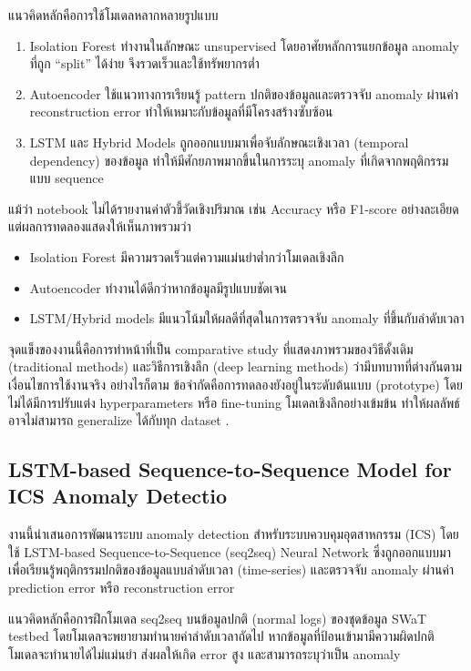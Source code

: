 แนวคิดหลักคือการใช้โมเดลหลากหลายรูปแบบ
\begin{enumerate}
  \item Isolation Forest ทำงานในลักษณะ unsupervised โดยอาศัยหลักการแยกข้อมูล anomaly ที่ถูก “split” ได้ง่าย จึงรวดเร็วและใช้ทรัพยากรต่ำ
  \item Autoencoder ใช้แนวทางการเรียนรู้ pattern ปกติของข้อมูลและตรวจจับ anomaly ผ่านค่า reconstruction error ทำให้เหมาะกับข้อมูลที่มีโครงสร้างซับซ้อน
  \item LSTM และ Hybrid Models ถูกออกแบบมาเพื่อจับลักษณะเชิงเวลา (temporal dependency) ของข้อมูล ทำให้มีศักยภาพมากขึ้นในการระบุ anomaly ที่เกิดจากพฤติกรรมแบบ sequence
\end{enumerate}

แม้ว่า notebook ไม่ได้รายงานค่าตัวชี้วัดเชิงปริมาณ เช่น Accuracy หรือ F1-score อย่างละเอียด แต่ผลการทดลองแสดงให้เห็นภาพรวมว่า

\begin{itemize}
  \item Isolation Forest มีความรวดเร็วแต่ความแม่นยำต่ำกว่าโมเดลเชิงลึก
  \item Autoencoder ทำงานได้ดีกว่าหากข้อมูลมีรูปแบบชัดเจน
  \item LSTM/Hybrid models มีแนวโน้มให้ผลดีที่สุดในการตรวจจับ anomaly ที่ขึ้นกับลำดับเวลา
\end{itemize}

จุดแข็งของงานนี้คือการทำหน้าที่เป็น comparative study ที่แสดงภาพรวมของวิธีดั้งเดิม (traditional methods) และวิธีการเชิงลึก (deep learning methods) ว่ามีบทบาทที่ต่างกันตามเงื่อนไขการใช้งานจริง อย่างไรก็ตาม ข้อจำกัดคือการทดลองยังอยู่ในระดับต้นแบบ (prototype) โดยไม่ได้มีการปรับแต่ง hyperparameters หรือ fine-tuning โมเดลเชิงลึกอย่างเข้มข้น ทำให้ผลลัพธ์อาจไม่สามารถ generalize ได้กับทุก dataset \cite{ref5}.

\subsection{LSTM-based Sequence-to-Sequence Model for ICS Anomaly Detectio}
\hspace{2em} งานนี้นำเสนอการพัฒนาระบบ anomaly detection สำหรับระบบควบคุมอุตสาหกรรม (ICS) โดยใช้ LSTM-based Sequence-to-Sequence (seq2seq) Neural Network ซึ่งถูกออกแบบมาเพื่อเรียนรู้พฤติกรรมปกติของข้อมูลแบบลำดับเวลา (time-series) และตรวจจับ anomaly ผ่านค่า prediction error หรือ reconstruction error

แนวคิดหลักคือการฝึกโมเดล seq2seq บนข้อมูลปกติ (normal logs) ของชุดข้อมูล SWaT testbed โดยโมเดลจะพยายามทำนายค่าลำดับเวลาถัดไป หากข้อมูลที่ป้อนเข้ามามีความผิดปกติ โมเดลจะทำนายได้ไม่แม่นยำ ส่งผลให้เกิด error สูง และสามารถระบุว่าเป็น anomaly

